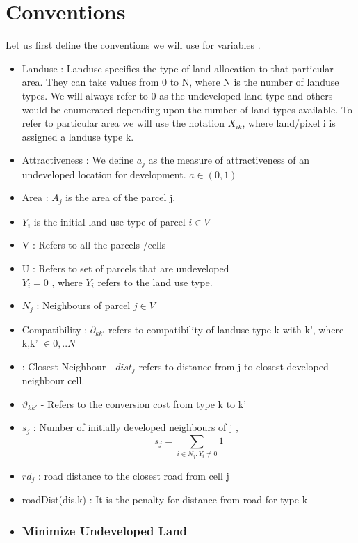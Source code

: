 \documentclass[twoside,10pt]{article}
\begin{document}
\section{Conventions}
Let us first define the conventions we will use for variables . \\ 
\begin{itemize}
\item Landuse : Landuse specifies the type of land allocation to that particular area. They can take values from 0 to N, where N is the number of landuse types. We will always refer to 0 as the undeveloped land type and others would be enumerated depending upon the number of land types available. To refer to particular area we will use the notation $X_{ik}$, where land/pixel i is assigned a landuse type k.
\item Attractiveness : We define $a_j$  as the measure of attractiveness of an undeveloped location for development. 
$ a \in (0,1)$
\item Area : $A_j$ is the area of the parcel j.
\item $Y_i$ is the initial land use type of parcel $i \in V$
\item V : Refers to all the parcels /cells

\item U : Refers to set of parcels that are undeveloped \\
 
$ Y_{i} = 0$ , where  $Y_{i}$ refers to the land use type. 
\item $N_j$ : Neighbours of parcel $j \in V$    
\item Compatibility : $\partial_{kk'}$ refers to compatibility of landuse type k with k', where k,k' $\in {0,..N}$
\item : Closest Neighbour -  $dist_j$ refers to distance from j to closest developed neighbour cell.
\item $\vartheta_{kk'} $ - Refers to the conversion cost from  type k to k'
\item $s_j$ : Number of initially developed neighbours of j , $$ s_j = \sum_{i \in N_j: Y_i \neq 0} 1$$
\item $rd_j$ : road distance to the closest road from cell  j
\item roadDist(dis,k) : It is the penalty for distance from road for type k


\item
\subsubsection*{Minimize Undeveloped Land}


\end{itemize}
\end{document}
